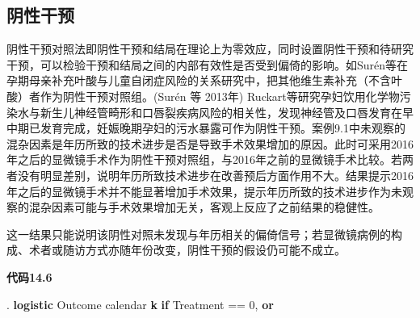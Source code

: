 \documentclass[
  chinese-hans,
  letterpaper,
  DIV=11,
  numbers=noendperiod]{scrreprt}
\newenvironment{Shaded}{\begin{snugshade}}{\end{snugshade}}
\newcommand{\KeywordTok}[1]{\textcolor[rgb]{0.00,0.23,0.31}{\textbf{#1}}}
\newcommand{\NormalTok}[1]{\textcolor[rgb]{0.00,0.23,0.31}{#1}}
\begin{document}
\subsection{阴性干预}\label{ux9634ux6027ux5e72ux9884}

阴性干预对照法即阴性干预和结局在理论上为零效应，同时设置阴性干预和待研究干预，可以检验干预和结局之间的内部有效性是否受到偏倚的影响。如Surén等在孕期母亲补充叶酸与儿童自闭症风险的关系研究中，把其他维生素补充（不含叶酸）者作为阴性干预对照组。(Surén
等 2013年)
Ruckart等研究孕妇饮用化学物污染水与新生儿神经管畸形和口唇裂疾病风险的相关性，发现神经管及口唇发育在早中期已发育完成，妊娠晚期孕妇的污水暴露可作为阴性干预。案例9.1中未观察的混杂因素是年历所致的技术进步是否是导致手术效果增加的原因。此时可采用2016年之后的显微镜手术作为阴性干预对照组，与2016年之前的显微镜手术比较。若两者没有明显差别，说明年历所致技术进步在改善预后方面作用不大。结果提示2016年之后的显微镜手术并不能显著增加手术效果，提示年历所致的技术进步作为未观察的混杂因素可能与手术效果增加无关，客观上反应了之前结果的稳健性。

这一结果只能说明该阴性对照未发现与年历相关的偏倚信号；若显微镜病例的构成、术者或随访方式亦随年份改变，阴性干预的假设仍可能不成立。

\begin{tcolorbox}[enhanced jigsaw, arc=.35mm, bottomrule=.15mm, breakable, colback=white, colframe=quarto-callout-note-color-frame, left=2mm, leftrule=.75mm, opacityback=0, rightrule=.15mm, toprule=.15mm]

\vspace{-3mm}\textbf{代码14.6}\vspace{3mm}

\begin{Shaded}
\begin{Highlighting}[]
\NormalTok{. }\KeywordTok{logistic}\NormalTok{ Outcome calendar }\KeywordTok{k} \KeywordTok{if}\NormalTok{ Treatment == 0, }\KeywordTok{or}
\end{Highlighting}
\end{Shaded}

\end{tcolorbox}
\end{document}
